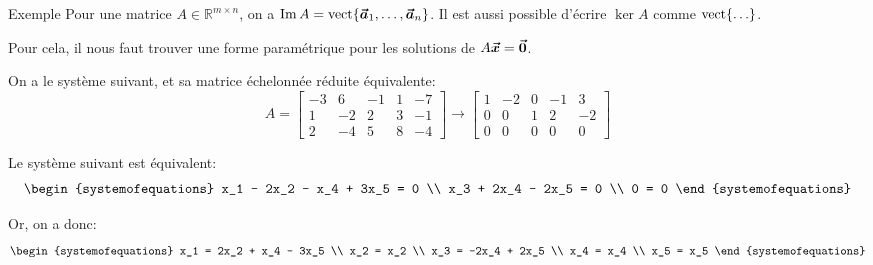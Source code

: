 \documentclass[a4paper]{article}
\begin{document}
\begin{parag}{Exemple}
    Pour une matrice $A \in \mathbb{R}^{m \times n}$, on a $\im A = \vect\left\{\bvec{a}_1, \ldots, \bvec{a}_n\right\}$. Il est aussi possible d'écrire $\ker A$ comme $\vect\left\{\ldots\right\}$.

    Pour cela, il nous faut trouver une forme paramétrique pour les solutions de $A \bm{\protect\vec{x}} = \bm{\protect\vec{0}}$.

    On a le système suivant, et sa matrice échelonnée réduite équivalente:
    \[A = \begin{bmatrix} -3 & 6 & -1 & 1 & -7 \\ 1 & -2 & 2 & 3 & -1 \\ 2 & -4 & 5 & 8 & -4 \end{bmatrix} \to \begin{bmatrix} 1 & -2 & 0 & -1 & 3 \\ 0 & 0 & 1 & 2 & -2 \\ 0 & 0 & 0 & 0 & 0 \end{bmatrix}  \]

    Le système suivant est équivalent:
    \[\begin{systemofequations}
    x_1 - 2x_2 - x_4 + 3x_5 = 0  \\
    x_3 + 2x_4 - 2x_5 = 0 \\
    0 = 0
    \end{systemofequations}\]

    Or, on a donc:
    \[\begin{systemofequations}
    x_1 = 2x_2 + x_4 - 3x_5 \\
    x_2 = x_2 \\
    x_3 = -2x_4 + 2x_5 \\
    x_4 = x_4 \\
    x_5 = x_5
    \end{systemofequations}\]


\end{parag}
\end{document}
